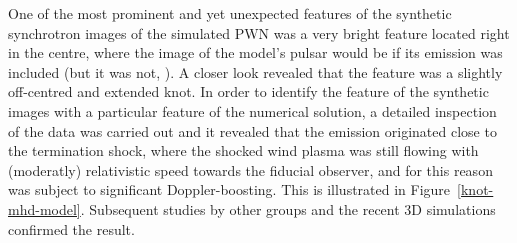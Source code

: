 One of the most prominent and yet unexpected features of the synthetic synchrotron images of the simulated PWN was a very bright feature located right in the centre, where the image of the model’s pulsar would be if its emission was included (but it was not, \cite{ssk-lyub-03,ssk-lyub-04}).  A closer look revealed that the feature was a slightly off-centred and extended knot.  In order to identify the feature of the synthetic images with a particular feature of the numerical solution,  a detailed inspection of the data was carried out and it revealed that the emission originated close to the termination shock, where the shocked wind plasma was still flowing with  (moderatly) relativistic speed towards the fiducial observer,  and for this reason was subject to significant Doppler-boosting.  This is illustrated in Figure~\ref{knot-mhd-model}. Subsequent  studies by other groups \cite{delzanna-06} and  the recent 3D simulations \citep{porth-13,porth-14} confirmed the result.    